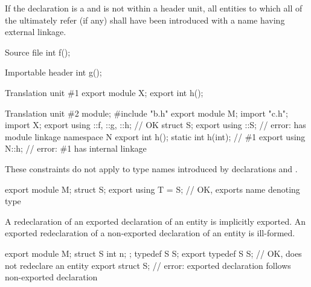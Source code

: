 \pnum
If the declaration is a 
and is not within a header unit,
all entities to which all of the
 ultimately refer (if any)
shall have been introduced with a name having external linkage.
\begin{example}
\begin{codeblocktu}{Source file }
int f();
\end{codeblocktu}

\begin{codeblocktu}{Importable header }
int g();
\end{codeblocktu}

\begin{codeblocktu}{Translation unit \#1}
export module X;
export int h();
\end{codeblocktu}

\begin{codeblocktu}{Translation unit \#2}
module;
#include "b.h"
export module M;
import "c.h";
import X;
export using ::f, ::g, ::h;     // OK
struct S;
export using ::S;               // error:  has module linkage
namespace N {
  export int h();
  static int h(int);            // \#1
}
export using N::h;              // error: \#1 has internal linkage
\end{codeblocktu}
\end{example}
\begin{note}
These constraints do not apply to
type names introduced by  declarations
and .
\begin{example}
\begin{codeblock}
export module M;
struct S;
export using T = S;             // OK, exports name  denoting type 
\end{codeblock}
\end{example}
\end{note}

\pnum
A redeclaration of an exported declaration of an entity
is implicitly exported.
An exported redeclaration of a non-exported declaration
of an entity is ill-formed.
\begin{example}
\begin{codeblock}
export module M;
struct S { int n; };
typedef S S;
export typedef S S;             // OK, does not redeclare an entity
export struct S;                // error: exported declaration follows non-exported declaration
\end{codeblock}
\end{example}

